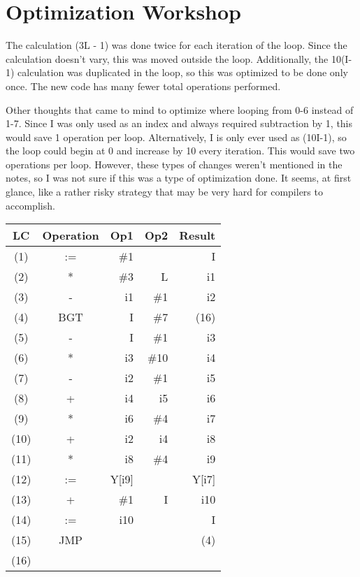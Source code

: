 \documentclass[a4paper,11pt]{article}
\begin{document}

\section*{Optimization Workshop}
The calculation (3L - 1) was done twice for each iteration of the loop.  Since the calculation doesn't vary, this was moved
outside the loop.  Additionally, the 10(I-1) calculation was duplicated in the loop, so this was optimized to be done only 
once.  The new code has many fewer total operations performed.  

Other thoughts that came to mind to optimize where looping from 0-6 instead of 1-7.  Since I was only used as an index
and always required subtraction by 1, this would save 1 operation per loop.  Alternatively, I is only ever used as (10I-1), 
so the loop could begin at 0 and increase by 10 every iteration.  This would save two operations per loop.  However, 
these types of changes weren't mentioned in the notes, so I was not sure if this was a type of optimization done.  It seems, 
at first glance, like a rather risky strategy that may be very hard for compilers to accomplish.  \\

\begin{tabular}{ | c | c | r | r | r |}
  \hline
    LC & Operation & Op1 & Op2 & Result  \\ \hline
    (1) & := & \#1 & & I \\ \hline
    (2) & * & \#3 & L & i1 \\ \hline
    (3) & - & i1 & \#1 & i2 \\ \hline
    (4) & BGT & I & \#7 & (16) \\ \hline
    (5) & - & I & \#1 & i3 \\ \hline
    (6) & * & i3 & \#10 & i4 \\ \hline
    (7) & - & i2 & \#1 & i5 \\ \hline
    (8) & + & i4 & i5 & i6 \\ \hline
    (9) & * & i6 & \#4 & i7 \\ \hline
  (10) & + & i2 & i4 & i8 \\ \hline
   (11) & * & i8 & \#4 & i9 \\ \hline
   (12) & := & Y[i9] &   & Y[i7] \\ \hline
   (13) & + & \#1 & I & i10 \\ \hline
   (14) & := & i10 &  & I \\ \hline
   (15) & JMP &  &  & (4) \\ \hline
   (16) &   &   &   &  \\ \hline

\end{tabular}

\end{document}
